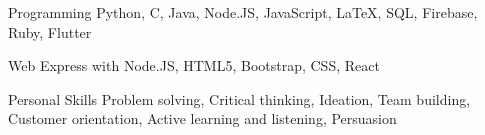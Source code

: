 


\begin{cvskills}


\cvskill
{Programming} %
{Python, C, Java, Node.JS, JavaScript, LaTeX, SQL, Firebase, Ruby, Flutter} %


\cvskill
{Web} %
{Express with Node.JS, HTML5, Bootstrap, CSS, React} %


\cvskill
{Personal Skills} %
{Problem solving, Critical thinking, Ideation, Team building, Customer orientation, Active learning and listening, Persuasion} %


\end{cvskills}